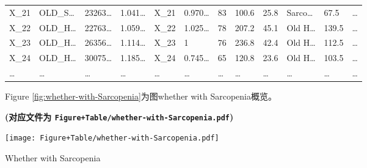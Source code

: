 \documentclass[
]{article}
\begin{document}
\begin{longtable}[]{@{}llllllllllll@{}}
X\_21 & OLD\_S\ldots{} & 23263\ldots{} & 1.041\ldots{} & X\_21 & 0.970\ldots{} & 83 & 100.6 & 25.8 & Sarco\ldots{} & 67.5 & \ldots{}\tabularnewline
X\_22 & OLD\_H\ldots{} & 22763\ldots{} & 1.059\ldots{} & X\_22 & 1.025\ldots{} & 78 & 207.2 & 45.1 & Old H\ldots{} & 139.5 & \ldots{}\tabularnewline
X\_23 & OLD\_H\ldots{} & 26356\ldots{} & 1.114\ldots{} & X\_23 & 1 & 76 & 236.8 & 42.4 & Old H\ldots{} & 112.5 & \ldots{}\tabularnewline
X\_24 & OLD\_H\ldots{} & 30075\ldots{} & 1.185\ldots{} & X\_24 & 0.745\ldots{} & 65 & 120.8 & 23.6 & Old H\ldots{} & 103.5 & \ldots{}\tabularnewline
\ldots{} & \ldots{} & \ldots{} & \ldots{} & \ldots{} & \ldots{} & \ldots{} & \ldots{} & \ldots{} & \ldots{} & \ldots{} & \ldots{}\tabularnewline
\bottomrule
\end{longtable}

Figure \ref{fig:whether-with-Sarcopenia}为图whether with Sarcopenia概览。

\textbf{(对应文件为 \texttt{Figure+Table/whether-with-Sarcopenia.pdf})}

\def\@captype{figure}
\begin{center}
\texttt{[image: Figure+Table/whether-with-Sarcopenia.pdf]}
\caption{Whether with Sarcopenia}\label{fig:whether-with-Sarcopenia}
\end{center}
\end{document}
